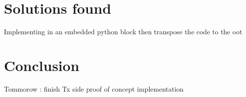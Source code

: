 \documentclass[a4paper, 12pt]{article}
\begin{document}
\section{Solutions found}
Implementing in an embedded python block then transpose the code to the oot 

\section{Conclusion}
Tommorow : finish Tx side proof of concept implementation 
\end{document}
